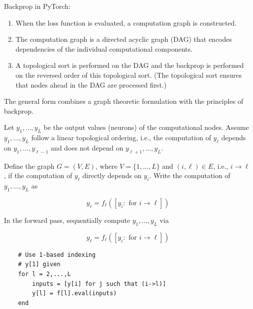 \documentclass{report}
\begin{document}
\begin{definition}
    Backprop in PyTorch:

    \begin{enumerate}
        \item When the loss function is evaluated, a computation graph is constructed.
        \item The computation graph is a directed acyclic graph (DAG) that encodes dependencies of the individual computational components.
        \item A topological sort is performed on the DAG and the backprop is performed on the reversed order of this topological sort. (The topological sort ensures that nodes ahead in the DAG are processed first.)
    \end{enumerate}

    The general form combines a graph theoretic formulation with the principles of backprop.
\end{definition}

\begin{definition}
    Let $y_{1}, \ldots, y_{L}$ be the output values (neurons) of the computational nodes. Assume $y_{1}, \ldots, y_{L}$ follow a linear topological ordering, i.e., the computation of $y_{\ell}$ depends on $y_{1}, \ldots, y_{\ell-1}$ and does not depend on $y_{\ell+1}, \ldots, y_{L}$.

    Define the graph $G=(V, E)$, where $V=\{1, \ldots, L\}$ and $(i, \ell) \in E$, i.e., $i \rightarrow \ell$, if the computation of $y_{\ell}$ directly depends on $y_{i}$. Write the computation of $y_{1}, \ldots, y_{L}$ as

    $$
    y_{\ell}=f_{\ell}\left(\left[y_{i}: \text { for } i \rightarrow \ell\right]\right)
    $$
\end{definition}

\begin{definition}
    In the forward pass, sequentially compute $y_{1}, \ldots, y_{L}$ via

    $$
    y_{\ell}=f_{\ell}\left(\left[y_{i}: \text { for } i \rightarrow \ell\right]\right)
    $$

    \begin{verbatim}
    # Use 1-based indexing
    # y[1] given
    for l = 2,...,L
        inputs = [y[i] for j such that (i->l)]
        y[l] = f[l].eval(inputs)
    end
    \end{verbatim}
\end{definition}
\end{document}
